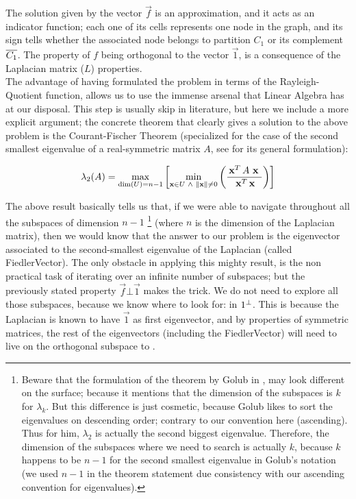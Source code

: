 The solution given by the vector $\vec{f}$ is an approximation, and it acts
as an indicator function; each one of its cells represents one node in
the graph, and its sign tells whether the associated node belongs to
partition $C_1$ or its complement $\overline{C_1}$. The property of $f$
being orthogonal to the vector $\vec{1}$, is a consequence of the
\gls{Laplacian} matrix ($L$) properties. \\

The advantage of having formulated the problem in terms of the
Rayleigh-Quotient function, allows us to use the immense arsenal that
Linear Algebra has at our disposal. This step is usually skip in
literature, but here we include a more explicit argument; the concrete
theorem that clearly gives a solution to the above problem is the
Courant-Fischer Theorem (specialized for the case of the second
smallest eigenvalue of a real-symmetric matrix $A$, see \cite{golub13}
for its general formulation):

\begin{equation*}
\lambda_2(A) =
\max\limits_{\operatorname{dim}(U) = n-1}
\left[
\min\limits_{\mathbf{x} \in U \,\,\land\,\, \left\lVert \mathbf{x} \right\rVert \ne 0}
\left(  
\dfrac{\,{\mathbf{x}}^{T}\, A \,\,\mathbf{x}\,\,}{\,{\mathbf{x}}^{T}\, \mathbf{x}}
\right)
\right]
\end{equation*}
\joinbelow{1cm}

The above result basically tells us that, if we were able to navigate
throughout all the subspaces of dimension $n-1$
\footnote{Beware that the formulation of the theorem by Golub in
  \cite{golub13}, may look different on the surface; because it
  mentions that the dimension of the subspaces is $k$ for $\lambda_k$. But
this difference is just cosmetic, because Golub likes to sort the
eigenvalues on descending order; contrary to our convention here
(ascending). Thus for him, $\lambda_2$ is actually
the second biggest eigenvalue. Therefore, the dimension of the
subspaces where we need to search is actually $k$, because $k$ happens
to be $n-1$ for the second smallest eigenvalue in Golub's notation (we
used $n-1$ in the theorem statement due consistency with our ascending
convention for eigenvalues).} 
(where $n$ is the
dimension of the \gls{Laplacian} matrix), then we would know that the answer
to our problem is the eigenvector associated to the second-smallest
eigenvalue of the \gls{Laplacian} (called \gls{FiedlerVector}). The only obstacle
in applying this mighty result, is the non practical task of iterating
over an infinite number of subspaces; but the previously stated
property $\vec{f} \bot \vec{1}$ makes the trick. We do not need to
explore all those subspaces, because we know where to look for: in
${1}^{\bot}$. This is because the \gls{Laplacian} is known to have $\vec{1}$ as first
eigenvector, and by properties of symmetric matrices, the rest of the
eigenvectors (including the \gls{FiedlerVector}) will need to live on the
orthogonal subspace to . 

